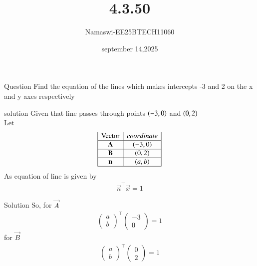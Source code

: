 \documentclass{beamer}
\begin{document}
\title 
{4.3.50}
\date{september 14,2025}


\author 
{Namaswi-EE25BTECH11060}
\frame{\titlepage}
\begin{frame}{Question}
Find the equation of the lines which makes intercepts -3 and 2 on the x and y axes respectively
\end{frame}
\begin{frame}{solution}
Given that line passes through points $\brak{-3,0}$ and $\brak{0,2}$ \\
Let
\[
\begin{array}{|c|c|}
\hline
\text{Vector} & coordinate \\ \hline
\vec{A} & (-3, 0) \\ \hline
\vec{B} & (0, 2) \\ \hline
\vec{n} & (a, b) \\ \hline
\end{array}
\]
As equation of line is given by 
\begin{align}
    \vec{n}^\top \vec{x}=1
\end{align}
\end{frame}
\begin{frame}{Solution}
   So, for $\vec{A}$
 \begin{align}
 \begin{pmatrix}
     a \\ b 
 \end{pmatrix}^\top\begin{pmatrix}
     -3  \\ 0
 \end{pmatrix}=1
  \end{align}
  for $\vec{B}$
 \begin{align}
 \begin{pmatrix}
     a \\ b 
 \end{pmatrix}^\top\begin{pmatrix}
     0  \\  2
 \end{pmatrix}=1\\ 
\end{align}
\end{frame}
\end{document}
